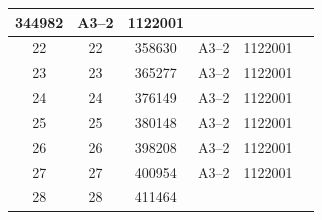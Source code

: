 \documentclass[UTF8,10pt,a4paper,fontset=fandol]{ctexart}
\newcommand{\fieldvalue}[1]{#1}
\begin{document}
\begin{center}
\begin{tabularx}{\textwidth}{|c|c|c|c|c|X|}
\fieldvalue{344982} &
\fieldvalue{A3--2} &
\fieldvalue{1122001} & \\
\hline
22 &
\fieldvalue{22} &
\fieldvalue{358630} &
\fieldvalue{A3--2} &
\fieldvalue{1122001} & \\
\hline
23 &
\fieldvalue{23} &
\fieldvalue{365277} &
\fieldvalue{A3--2} &
\fieldvalue{1122001} & \\
\hline
24 &
\fieldvalue{24} &
\fieldvalue{376149} &
\fieldvalue{A3--2} &
\fieldvalue{1122001} & \\
\hline
25 &
\fieldvalue{25} &
\fieldvalue{380148} &
\fieldvalue{A3--2} &
\fieldvalue{1122001} & \\
\hline
26 &
\fieldvalue{26} &
\fieldvalue{398208} &
\fieldvalue{A3--2} &
\fieldvalue{1122001} & \\
\hline
27 &
\fieldvalue{27} &
\fieldvalue{400954} &
\fieldvalue{A3--2} &
\fieldvalue{1122001} & \\
\hline
28 &
\fieldvalue{28} &
\fieldvalue{411464} &

\end{tabularx}
\end{center}
\end{document}
